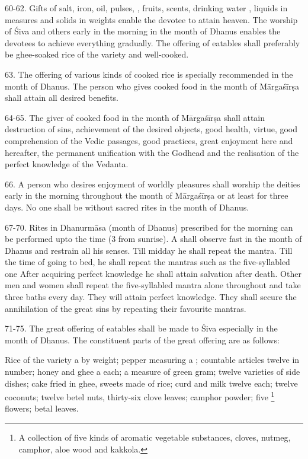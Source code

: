 60-62. Gifts of salt, iron, oil, pulses, , fruits, scents,
drinking water \etc, liquids in  measures and solids in 
weights enable the devotee to attain heaven. The worship of Śiva and others
early in the morning in the month of Dhanus enables the devotees to achieve
everything gradually. The offering of eatables shall preferably be ghee-soaked
rice of the  variety and well-cooked.

63. The offering of various kinds of cooked rice is specially recommended in
the month of Dhanus. The person who gives cooked food in the month of Mārgaśīrṣa
shall attain all desired benefits.

64-65. The giver of cooked food in the month of Mārgaśīrṣa shall attain
destruction of sins, achievement of the desired objects, good health, virtue,
good comprehension of the Vedic passages, good practices, great enjoyment here
and hereafter, the permanent unification with the Godhead and the realisation of
the perfect knowledge of the Vedanta.

66. A person who desires enjoyment of worldly pleasures shall worship
the deities early in the morning throughout the month of Mārgaśīrṣa or at least
for three days. No one shall be without sacred rites in the month of Dhanus.

67-70. Rites in Dhanurmāsa (month of Dhanus) prescribed for the morning can be
performed upto the  time (3  from sunrise).
A  shall observe fast in the month of Dhanus and restrain all his
senses. Till midday he shall repeat the  mantra. Till the time of
going to bed, he shall repeat the mantras such as the five-syllabled one \etc
After acquiring perfect knowledge he shall attain salvation after death. Other
men and women shall repeat the five-syllabled mantra alone throughout and take
three baths every day. They will attain perfect knowledge. They shall secure
the annihilation of the great sins by repeating their favourite mantras.

71-75. The great offering of eatables shall be made to Śiva especially in
the month of Dhanus. The constituent parts of the great offering are as follows:

Rice of the  variety a  by weight; pepper measuring
a ; countable articles twelve in number; honey and ghee
a  each; a  measure of green gram; twelve varieties of
side dishes; cake fried in ghee, sweets made of  rice; curd and milk
twelve  each; twelve coconuts; twelve betel nuts, thirty-six clove
leaves; camphor powder; five \footnote{A collection of five kinds
of aromatic vegetable substances, \viz cloves, nutmeg, camphor, aloe wood and
kakkola.} flowers; betal leaves.

